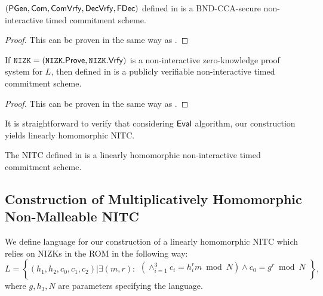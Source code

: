 \begin{theorem}
$(\mathsf{PGen}, \mathsf{Com}, \mathsf{ComVrfy}, \mathsf{DecVrfy}, \mathsf{FDec})$ defined in  is a BND-CCA-secure non-interactive timed commitment scheme. 
\end{theorem}

\begin{proof}
This can be proven in the same way as .
\end{proof}

\begin{theorem}
If $\mathtt{NIZK} = (\mathtt{NIZK}.\mathsf{Prove}, \mathtt{NIZK}.\mathsf{Vrfy})$ is a non-interactive zero-knowledge proof system for $L$, then \mathlist{(\pgen, \com, \cvrfy, \dvrfy, \fdecom, \fdvrfy)} defined in  is a publicly verifiable non-interactive timed commitment scheme.
\end{theorem}

\begin{proof}
This can be proven in the same way as .
\end{proof}

It is straightforward to verify that considering $\mathsf{Eval}$ algorithm, our construction yields linearly homomorphic NITC. 
\begin{theorem}\label{hom-lh-rom}
The NITC \mathlist{(\pgen, \com, \cvrfy, \dvrfy, \fdecom, \fdvrfy, \eval)} defined in  is a linearly homomorphic non-interactive timed commitment scheme.
\end{theorem}









\subsection{Construction of Multiplicatively Homomorphic Non-Malleable NITC}
We define language for our construction of a linearly homomorphic NITC which relies on NIZKs in the ROM in the following way:
\[
L = \left\{(h_1, h_2, c_0, c_1, c_2)| \exists (m,r):
\begin{aligned}
       (\land_{i=1}^3 c_i = h_i^{r}m \bmod N) \land
       c_0 = g^r \bmod N\\
    \end{aligned}
    \right\}, 
\]
where $g, h_3, N$ are parameters specifying the language.




